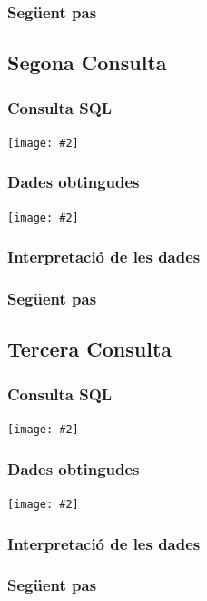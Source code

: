 \documentclass[a4paper,12pt]{article}
\newcommand{\mygraphic}[2][width=\textwidth]{\begin{center}
		\centering\texttt{[image: \#2]}\par
\end{center}}
\begin{document}
\subsubsection{Següent pas}

\subsection{Segona Consulta}

\subsubsection{Consulta SQL}
\mygraphic{imatges/3.png}

\subsubsection{Dades obtingudes}
\mygraphic{imatges/4.png}

\subsubsection{Interpretació de les dades}

\subsubsection{Següent pas}

\subsection{Tercera Consulta}

\subsubsection{Consulta SQL}
\mygraphic{imatges/5.png}

\subsubsection{Dades obtingudes}
\mygraphic{imatges/6.png}

\subsubsection{Interpretació de les dades}

\subsubsection{Següent pas}
\end{document}
